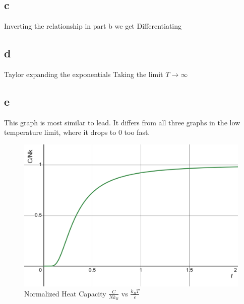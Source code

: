 \subsection*{c}
Inverting the relationship in part b we get
Differentiating
\subsection*{d}
Taylor expanding the exponentials
Taking the limit $T \rightarrow \infty$
\pagebreak
\subsection*{e}
This graph is most similar to lead. It differs from all three graphs in the low temperature limit, where it drops to $0$ too fast.
\begin{figure}[h]
    \centering
    \includegraphics[width=1\linewidth]{Resources//112//Homework 2/112 Homework 2 Problem 2.png}
    \caption{Normalized Heat Capacity $\frac{C}{Nk_B}$ vs $\frac{k_BT}{\epsilon}$}
    \label{fig:enter-label}
\end{figure}

